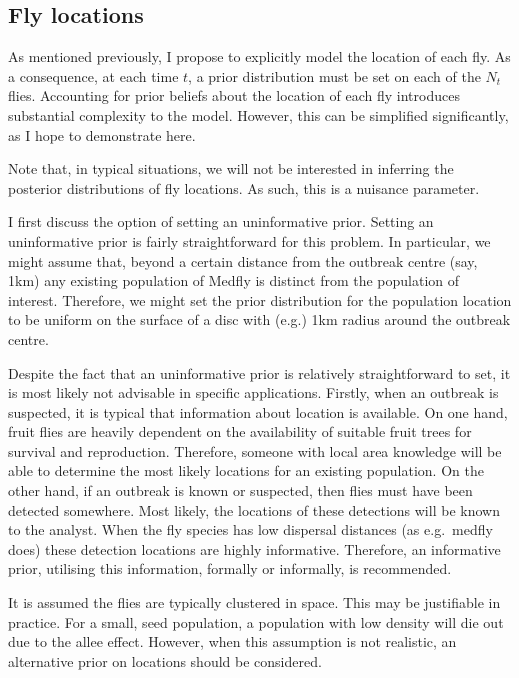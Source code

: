 \documentclass[
  oneside]{book}
\begin{document}
\hypertarget{fly-locations}{%
\subsection{Fly locations}\label{fly-locations}}

As mentioned previously, I propose to explicitly model the location of each fly. As a consequence, at each time \(t\), a prior distribution must be set on each of the \(N_t\) flies. Accounting for prior beliefs about the location of each fly introduces substantial complexity to the model. However, this can be simplified significantly, as I hope to demonstrate here.

Note that, in typical situations, we will not be interested in inferring the posterior distributions of fly locations. As such, this is a nuisance parameter.

I first discuss the option of setting an uninformative prior. Setting an uninformative prior is fairly straightforward for this problem. In particular, we might assume that, beyond a certain distance from the outbreak centre (say, 1km) any existing population of Medfly is distinct from the population of interest. Therefore, we might set the prior distribution for the population location to be uniform on the surface of a disc with (e.g.) 1km radius around the outbreak centre.

Despite the fact that an uninformative prior is relatively straightforward to set, it is most likely not advisable in specific applications. Firstly, when an outbreak is suspected, it is typical that information about location is available. On one hand, fruit flies are heavily dependent on the availability of suitable fruit trees for survival and reproduction. Therefore, someone with local area knowledge will be able to determine the most likely locations for an existing population. On the other hand, if an outbreak is known or suspected, then flies must have been detected somewhere. Most likely, the locations of these detections will be known to the analyst. When the fly species has low dispersal distances (as e.g.~medfly does) these detection locations are highly informative. Therefore, an informative prior, utilising this information, formally or informally, is recommended.

It is assumed the flies are typically clustered in space. This may be justifiable in practice. For a small, seed population, a population with low density will die out due to the allee effect. However, when this assumption is not realistic, an alternative prior on locations should be considered.
\end{document}
